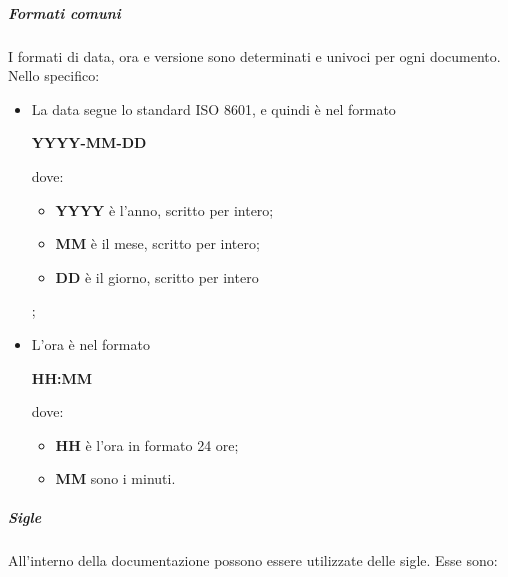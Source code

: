 \documentclass[../norme-di-progetto.tex]{subfiles}
\begin{document}
\subparagraph{Formati comuni}
I formati di data, ora e versione sono determinati e univoci per ogni documento. Nello specifico:
\begin{itemize}
  \item La data segue lo standard ISO 8601, e quindi è nel formato \\ \begin{center}
    \centering
    \textbf{YYYY-MM-DD}
  \end{center} dove:
  \begin{itemize}
    \item \textbf{YYYY} è l'anno, scritto per intero;
    \item \textbf{MM} è il mese, scritto per intero;
    \item \textbf{DD} è il giorno, scritto per intero
  \end{itemize};
  \item L'ora è nel formato \\ \begin{center}
  \centering
  \textbf{HH:MM}
  \end{center} dove:
  \begin{itemize}
    \item \textbf{HH} è l'ora in formato 24 ore;
    \item \textbf{MM} sono i minuti.
  \end{itemize}
\end{itemize}
\subparagraph{Sigle}
All'interno della documentazione possono essere utilizzate delle sigle. Esse sono:
\end{document}
